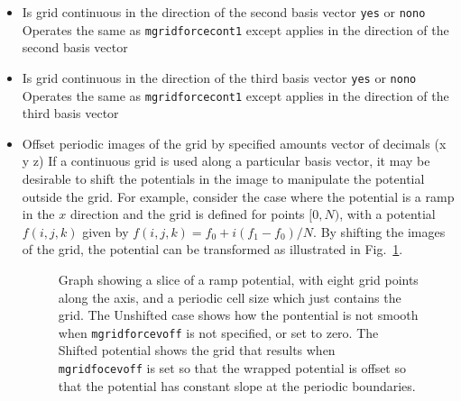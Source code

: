 \begin{itemize}
\item
{}
{Is grid continuous in the direction of the second basis vector}
{{\tt yes} or {\tt no}}{{\tt no}}
{Operates the same as {\tt mgridforcecont1} except applies in the direction of the second basis vector}

\item
{}
{Is grid continuous in the direction of the third basis vector}
{{\tt yes} or {\tt no}}{{\tt no}}
{Operates the same as {\tt mgridforcecont1} except applies in the direction of the third basis vector}

\item
{}
{Offset periodic images of the grid by specified amounts}
{vector of decimals (x y z)}
{If a continuous grid is used along a particular basis vector, it may be desirable to shift the potentials in the image to manipulate the potential outside the grid. For example, consider the case where the potential is a ramp in the $x$ direction and the grid is defined for points $[0,N)$, with a potential $f(i,j,k)$ given by $f(i,j,k) = f_0 + i (f_1-f_0) / N$. By shifting the images of the grid, the potential can be transformed as illustrated in Fig.~\ref{fig:gridshift}.
}

\begin{figure}[htb]
  \caption[Graph showing a slice of a ramp potential, showing the effect of 
           {\tt mgridforcevoff}]
  {\small Graph showing a slice of a ramp potential, with eight grid points along the axis, and a periodic cell size which just contains the grid. The Unshifted case shows how the pontential is not smooth when {\tt mgridforcevoff} is not specified, or set to zero. The Shifted potential shows the grid that results when {\tt mgridfocevoff} is set so that the wrapped potential is offset so that the potential has constant slope at the periodic boundaries.}
  \label{fig:gridshift}
\end{figure}

\end{itemize}

